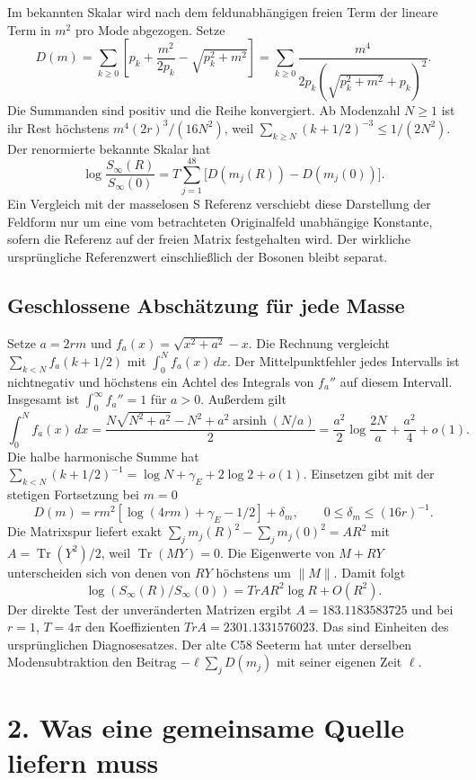 \documentclass[11pt,a4paper]{article}
\newcommand{\Tr}{\operatorname{Tr}}
\begin{document}
Im bekannten Skalar wird nach dem feldunabhängigen freien Term der lineare Term in \(m^2\) pro Mode abgezogen. Setze
\[
 D(m)=\sum_{k\ge0}\left[p_k+\frac{m^2}{2p_k}-\sqrt{p_k^2+m^2}\right]
     =\sum_{k\ge0}\frac{m^4}{2p_k(\sqrt{p_k^2+m^2}+p_k)^2}.
\]
Die Summanden sind positiv und die Reihe konvergiert. Ab Modenzahl \(N\ge1\) ist ihr Rest höchstens \(m^4(2r)^3/(16N^2)\), weil \(\sum_{k\ge N}(k+1/2)^{-3}\le 1/(2N^2)\). Der renormierte bekannte Skalar hat
\[
 \log\frac{S_\infty(R)}{S_\infty(0)}
   =T\sum_{j=1}^{48}\bigl[D(m_j(R))-D(m_j(0))\bigr].
\]
Ein Vergleich mit der masselosen S Referenz verschiebt diese Darstellung der Feldform nur um eine vom betrachteten Originalfeld unabhängige Konstante, sofern die Referenz auf der freien Matrix festgehalten wird. Der wirkliche ursprüngliche Referenzwert einschließlich der Bosonen bleibt separat.

\subsection*{Geschlossene Abschätzung für jede Masse}
Setze \(a=2rm\) und \(f_a(x)=\sqrt{x^2+a^2}-x\). Die Rechnung vergleicht \(\sum_{k<N} f_a(k+1/2)\) mit \(\int_0^N f_a(x)\,dx\). Der Mittelpunktfehler jedes Intervalls ist nichtnegativ und höchstens ein Achtel des Integrals von \(f_a''\) auf diesem Intervall. Insgesamt ist \(\int_0^\infty f_a''=1\) für \(a>0\). Außerdem gilt
\[
 \int_0^N f_a(x)\,dx
 =\frac{N\sqrt{N^2+a^2}-N^2+a^2\operatorname{arsinh}(N/a)}2
 =\frac{a^2}{2}\log\frac{2N}{a}+\frac{a^2}{4}+o(1).
\]
Die halbe harmonische Summe hat \(\sum_{k<N}(k+1/2)^{-1}=\log N+\gamma_E+2\log 2+o(1)\). Einsetzen gibt mit der stetigen Fortsetzung bei \(m=0\)
\[
 \boxed{D(m)=r m^2[\log(4rm)+\gamma_E-1/2]+\delta_m,
          \qquad 0\le\delta_m\le (16r)^{-1}.}
\]
Die Matrixspur liefert exakt \(\sum_j m_j(R)^2-\sum_j m_j(0)^2=A R^2\) mit \(A=\Tr(Y^2)/2\), weil \(\Tr(MY)=0\). Die Eigenwerte von \(M+RY\) unterscheiden sich von denen von \(RY\) höchstens um \(\|M\|\). Damit folgt
\[
 \log(S_\infty(R)/S_\infty(0))=T r A R^2\log R+O(R^2).
\]
Der direkte Test der unveränderten Matrizen ergibt \(A=183.1183583725\) und bei \(r=1\), \(T=4\pi\) den Koeffizienten \(T r A=2301.1331576023\). Das sind Einheiten des ursprünglichen Diagnosesatzes. Der alte C58 Seeterm hat unter derselben Modensubtraktion den Beitrag \(-\ell\sum_j D(m_j)\) mit seiner eigenen Zeit \(\ell\).

\clearpage
\section*{2. Was eine gemeinsame Quelle liefern muss}
\end{document}
